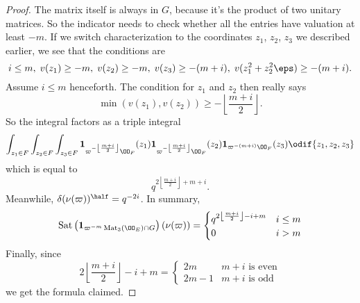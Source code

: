 \begin{proof}
  The matrix itself is always in $G$, because it's the product of two unitary matrices.
  So the indicator needs to check whether all the entries have valuation at least $-m$.
  If we switch characterization to the coordinates $z_1$, $z_2$, $z_3$ we described earlier,
  we see that the conditions are
  \[ i \le m, \; v(z_1) \ge -m, \; v(z_2) \ge -m, \; v(z_3) \ge -(m+i), \;
    v(z_1^2 + z_2^2 \eps) \ge -(m+i). \]
  Assume $i \le m$ henceforth.
  The condition for $z_1$ and $z_2$ then really says
  \[ \min(v(z_1), v(z_2)) \ge -\left\lfloor \frac{m+i}{2} \right\rfloor. \]
  So the integral factors as a triple integral
  \[
    \int_{z_1 \in F}
    \int_{z_2 \in F}
    \int_{z_3 \in F}
    \mathbf{1}_{\varpi^{-\left\lfloor \frac{m+i}{2} \right\rfloor} \OO_F}(z_1)
    \mathbf{1}_{\varpi^{-\left\lfloor \frac{m+i}{2} \right\rfloor} \OO_F}(z_2)
    \mathbf{1}_{\varpi^{-(m+i)} \OO_F}(z_3)
    \odif{z_1,z_2,z_3}
  \]
  which is equal to
  \[ q^{2\left\lfloor \frac{m+i}{2} \right\rfloor+m+i}. \]
  Meanwhile, $\delta(\nu(\varpi))^{\half} = q^{-2i}$.
  In summary,
  \[
    \Sat\left( \mathbf{1}_{\varpi^{-m} \Mat_3(\OO_E) \cap G}\right) \left( \nu(\varpi) \right)
    =
    \begin{cases}
      q^{2\left\lfloor \frac{m+i}{2} \right\rfloor - i + m} & i \le m \\
      0 & i > m
    \end{cases}
  \]
  Finally, since
  \[ 2\left\lfloor \frac{m+i}{2} \right\rfloor - i + m
    = \begin{cases}
      2m & m+i \text{ is even} \\
      2m-1 & m+i \text{ is odd}
    \end{cases}
  \]
  we get the formula claimed.
\end{proof}
